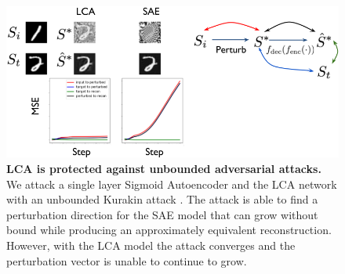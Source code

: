 \begin{figure}
    \centering
    \includegraphics[width=\textwidth]{figures/lca_sae_unbounded_attack.png}
    \caption{\textbf{LCA is protected against unbounded adversarial attacks.} We attack a single layer Sigmoid Autoencoder and the LCA network with an unbounded Kurakin attack \parencite{kurakin2016adversarial}. The attack is able to find a perturbation direction for the SAE model that can grow without bound while producing an approximately equivalent reconstruction. However, with the LCA model the attack converges and the perturbation vector is unable to continue to grow.}
    \label{fig:ch4_lca_sae_unbounded_attack}
\end{figure}






